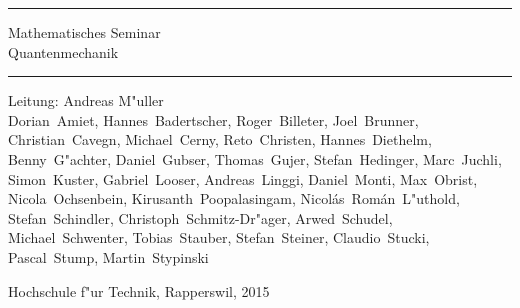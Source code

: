 \documentclass{book}
\begin{document}
\pagestyle{fancy}
\frontmatter
\newcommand\HRule{\noindent\rule{\linewidth}{1.5pt}}
\begin{titlepage}
\HRule
\vspace*{5pt}
\begin{flushright}
{
\LARGE
Mathematisches Seminar\\
\vspace*{20pt}
\Huge
Quantenmechanik%
}
\vspace*{5pt}
\end{flushright}
\HRule
\begin{flushright}
\vspace{60pt}
\Large
Leitung: Andreas M"uller\\
\vspace{40pt}
\Large
Dorian~Amiet, Hannes~Badertscher, Roger~Billeter, Joel~Brunner,
Christian~Cavegn, Michael~Cerny, Reto~Christen, Hannes~Diethelm,
Benny~G"achter, Daniel~Gubser, Thomas~Gujer, Stefan~Hedinger,
Marc~Juchli, Simon~Kuster, Gabriel~Looser, Andreas~Linggi,
Daniel~Monti, Max~Obrist, Nicola~Ochsenbein, Kirusanth~Poopalasingam,
Nicol\'as~Rom\'an~L"uthold, Stefan~Schindler, Christoph~Schmitz-Dr"ager,
Arwed~Schudel, Michael~Schwenter, Tobias~Stauber, Stefan~Steiner,
Claudio~Stucki, Pascal~Stump, Martin~Stypinski
\end{flushright}
\begin{center}
Hochschule f"ur Technik, Rapperswil, 2015
\end{center}
\end{titlepage}
\hypersetup{
    colorlinks=true,
    linktoc=all,
    linkcolor=blue
}
\newenvironment{beispiele}{
\bgroup\smallskip\parindent0pt\bf Beispiele\egroup

\begin{list}{\arabic{beispiel}.}
  {\usecounter{beispiel}
  \setlength{\labelsep}{5mm}
  \setlength{\rightmargin}{0pt}
}}{\end{list}}
\newenvironment{uebungsaufgaben}{
\begin{list}{\arabic{uebungsaufgabe}.}
  {\usecounter{uebungsaufgabe}
  \setlength{\labelwidth}{2cm}
  \setlength{\leftmargin}{0pt}
  \setlength{\labelsep}{5mm}
  \setlength{\rightmargin}{0pt}
  \setlength{\itemindent}{0pt}
}}{\end{list}\vfill\pagebreak}
\newenvironment{teilaufgaben}{
\begin{enumerate}
\renewcommand{\labelenumi}{\alph{enumi})}
}{\end{enumerate}}
\end{document}
